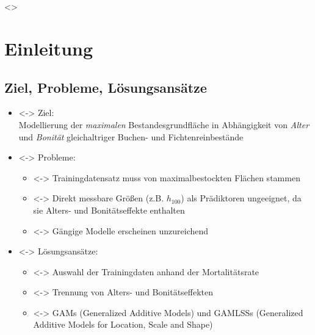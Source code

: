 
\section*{}
\begin{frame}[c]
  \only<\theFirstElement>{}
\end{frame}

\section{Einleitung}
\subsection{Ziel, Probleme, Lösungsansätze}
\begin{frame}[c]
  \begin{itemize}
  \item<\theFirstElement-> Ziel: \\
    Modellierung der \emph{maximalen} Bestandesgrundfläche in Abhängigkeit von \emph{Alter} und \emph{Bonität} gleichaltriger Buchen- und Fichtenreinbestände
  \item<\theSecondElement-> Probleme:
    \begin{itemize}
    \item<\theSecondElement-> Trainingdatensatz muss von maximalbestockten Flächen stammen
    \item<\theSecondElement-> Direkt messbare Größen (z.B. \(h_{100}\)) als Prädiktoren ungeeignet, da sie Alters- und Bonitätseffekte enthalten
    \item<\theSecondElement-> Gängige Modelle erscheinen unzureichend
    \end{itemize}
  \end{itemize}
  \begin{itemize}
  \item<\theThirdElement-> Lösungsansätze:
    \begin{itemize}
    \item<\theThirdElement-> Auswahl der Trainingdaten anhand der Mortalitätsrate
    \item<\theThirdElement-> Trennung von Alters- und Bonitätseffekten
    \item<\theThirdElement-> GAMs (Generalized Additive Models) und GAMLSSs (Generalized Additive Models for Location, Scale and Shape)
    \end{itemize}
  \end{itemize}
\end{frame}


